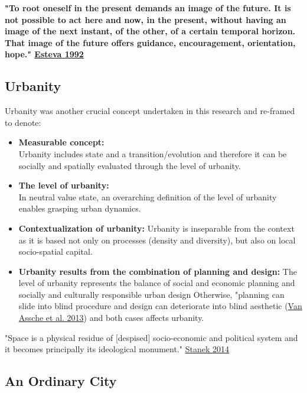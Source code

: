 \documentclass[11pt]{report}
\begin{document}
{\textbf{"To root oneself in the present demands an image of the future. It is not possible to act here and now, in the present, without having an image of the next instant, of the other, of a certain temporal horizon. That image of the future offers guidance, encouragement, orientation, hope." \href{}{Esteva 1992}}

\subsection{Urbanity}

Urbanity was another crucial concept undertaken in this research and re-framed to denote:

\begin{itemize}
\item \textbf{Measurable concept:}
\\
Urbanity includes state and a transition/evolution and therefore it can be socially and spatially evaluated through the level of urbanity.

\item \textbf{The level of urbanity:}
\\
In neutral value state, an overarching definition of the level of urbanity enables grasping urban dynamics.

\item \textbf{Contextualization of urbanity:}
Urbanity is inseparable from the context as it is based not only on processes (density and diversity), but also  on local socio-spatial capital.

\item \textbf{Urbanity results from the combination of planning and design:}
The level of urbanity represents the balance of social and economic planning and socially and culturally responsible urban design
Otherwise, "planning can slide into blind procedure and design can deteriorate into blind aesthetic
(\href{}{Van Assche et al. 2013}) and both cases affects urbanity.
\end{itemize}

"Space is a physical residue of [despised] socio-economic and political system and it becomes principally its ideological monument." \href{}{Stanek 2014}

\subsection{An Ordinary City}

}
\end{document}
